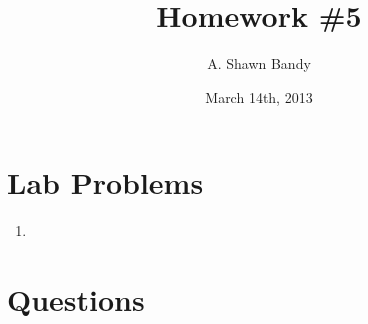 \documentclass{article}
\begin{document}
\title{Homework \#5}
\author{A. Shawn Bandy}
\date{March 14th, 2013}
\maketitle
	\section{Lab Problems}
		\begin{enumerate}[L1]
			\item 
			
		\end{enumerate}
\begingroup
	\section{Questions}\hfill\\
		\let\clearpage\relax
		\begin{enumerate}[Q1]
			
			
		\end{enumerate}
\endgroup
\end{document}
